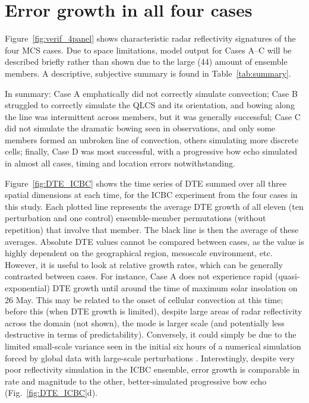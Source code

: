 \documentclass{ametsoc}
\begin{document}
\section{Error growth in all four cases}

Figure~\ref{fig:verif_4panel} shows characteristic radar reflectivity signatures of the four MCS cases. Due to space limitations, model output for Cases A--C will be described briefly rather than shown due to the large (44) amount of ensemble members. A descriptive, subjective summary is found in Table~\ref{tab:summary}.


In summary: Case A emphatically did not correctly simulate convection; Case B struggled to correctly simulate the QLCS and its orientation, and bowing along the line was intermittent across members, but it was generally successful; Case C did not simulate the dramatic bowing seen in observations, and only some members formed an unbroken line of convection, others simulating more discrete cells; finally, Case D was most successful, with a progressive bow echo simulated in almost all cases, timing and location errors notwithstanding.

Figure~\ref{fig:DTE_ICBC} shows the time series of DTE summed over all three spatial dimensions at each time, for the ICBC experiment from the four cases in this study. Each plotted line represents the average DTE growth of all eleven (ten perturbation and one control) ensemble-member permutations (without repetition) that involve that member. The black line is then the average of these averages. Absolute DTE values cannot be compared between cases, as the value is highly dependent on the geographical region, mesoscale environment, etc. However, it is useful to look at relative growth rates, which can be generally contrasted between cases. For instance, Case A does not experience rapid (quasi-exponential) DTE growth until around the time of maximum solar insolation on 26 May. This may be related to the onset of cellular convection at this time; before this (when DTE growth is limited), despite large areas of radar reflectivity across the domain (not shown), the mode is larger scale (and potentially less destructive in terms of predictability). Conversely, it could simply be due to the limited small-scale variance seen in the initial six hours of a numerical simulation forced by global data with large-scale perturbations \citep{Kuhnlein2014-ys}. Interestingly, despite very poor reflectivity simulation in the ICBC ensemble, error growth is comparable in rate and magnitude to the other, better-simulated progressive bow echo (Fig.~\ref{fig:DTE_ICBC}d).
\end{document}
